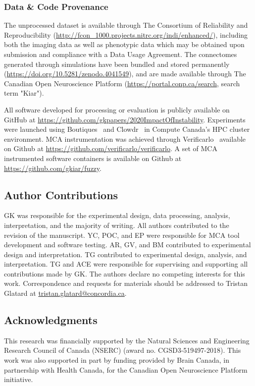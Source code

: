 \documentclass[fleqn,10pt]{SelfArx} %
\begin{document}
\subsubsection*{Data \& Code Provenance}
The unprocessed dataset is available through The Consortium of Reliability and Reproducibility
(\url{http://fcon_1000.projects.nitrc.org/indi/enhanced/}), including both the imaging data as well as phenotypic data
which may be obtained upon submission and compliance with a Data Usage Agreement. The connectomes generated through
simulations have been bundled and stored permanently (\url{https://doi.org/10.5281/zenodo.4041549}), and are made
available through The Canadian Open Neuroscience Platform (\url{https://portal.conp.ca/search}, search term "Kiar").

All software developed for processing or evaluation is publicly available on GitHub at
\url{https://github.com/gkpapers/2020ImpactOfInstability}. Experiments were launched using
Boutiques~\cite{Glatard2018-tu} and Clowdr~\cite{Kiar2019-sr} in Compute Canada's HPC cluster environment. MCA
instrumentation was achieved through Verificarlo~\cite{Denis2016-wo} available on Github at
\url{https://github.com/verificarlo/verificarlo}. A set of MCA instrumented software containers is available on Github
at \url{https://github.com/gkiar/fuzzy}.


\subsection*{Author Contributions}
GK was responsible for the experimental design, data processing, analysis, interpretation, and the majority of writing.
All authors contributed to the revision of the manuscript. YC, POC, and EP were responsible for MCA tool development
and software testing. AR, GV, and BM contributed to experimental design and interpretation. TG contributed to
experimental design, analysis, and interpretation. TG and ACE were responsible for supervising and supporting all
contributions made by GK. The authors declare no competing interests for this work. Correspondence and requests for
materials should be addressed to Tristan Glatard at \url{tristan.glatard@concordia.ca}.

\subsection*{Acknowledgments} 
This research was financially supported by the Natural Sciences and Engineering Research Council of Canada (NSERC)
(award no. CGSD3-519497-2018). This work was also supported in part by funding provided by Brain Canada, in partnership
with Health Canada, for the Canadian Open Neuroscience Platform initiative.
\end{document}
